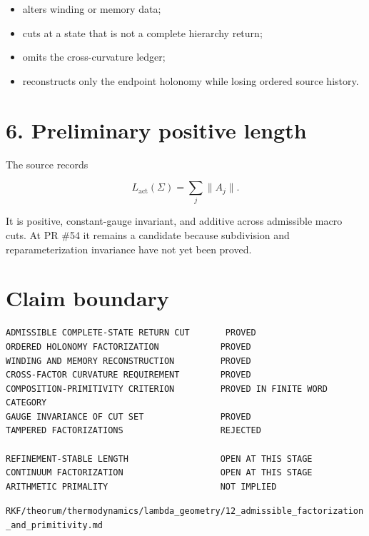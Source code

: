 \begin{itemize}
\tightlist
\item
  alters winding or memory data;
\item
  cuts at a state that is not a complete hierarchy return;
\item
  omits the cross-curvature ledger;
\item
  reconstructs only the endpoint holonomy while losing ordered source history.
\end{itemize}

\hypertarget{preliminary-positive-length}{%
\section{6. Preliminary positive length}\label{preliminary-positive-length}}

The source records

\[
L_{\mathrm{act}}(\Sigma)=\sum_j\|A_j\|.
\]

It is positive, constant-gauge invariant, and additive across admissible macro cuts. At PR \#54 it remains a candidate because subdivision and reparameterization invariance have not yet been proved.

\hypertarget{claim-boundary}{%
\section{Claim boundary}\label{claim-boundary}}

\begin{verbatim}
ADMISSIBLE COMPLETE-STATE RETURN CUT       PROVED
ORDERED HOLONOMY FACTORIZATION            PROVED
WINDING AND MEMORY RECONSTRUCTION         PROVED
CROSS-FACTOR CURVATURE REQUIREMENT        PROVED
COMPOSITION-PRIMITIVITY CRITERION         PROVED IN FINITE WORD CATEGORY
GAUGE INVARIANCE OF CUT SET               PROVED
TAMPERED FACTORIZATIONS                   REJECTED

REFINEMENT-STABLE LENGTH                  OPEN AT THIS STAGE
CONTINUUM FACTORIZATION                   OPEN AT THIS STAGE
ARITHMETIC PRIMALITY                      NOT IMPLIED
\end{verbatim}

\begin{flushright}\small\texttt{RKF/theorum/thermodynamics/lambda\_geometry/12\_admissible\_factorization\_and\_primitivity.md}\end{flushright}
